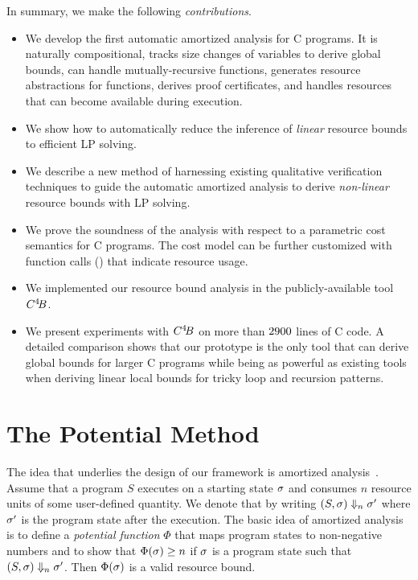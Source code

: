 \documentclass{sigplanconf}
\newcommand{\ifshort}[2]{\ifx\fullversion\undefined{#1}\else{#2}\fi}
\newcommand{\itemskip}[0]{\ifshort{\vspace{-3pt}}{}}
\newcommand{\itemskipIn}[0]{\ifshort{\vspace{-1pt}}{}}
\newcommand{\sectskip}[0]{\ifshort{\vspace{-3pt}}{}}
\newcommand{\aftersectskip}[0]{\ifshort{\vspace{-1pt}}{}}
\begin{document}
In summary, we make the following \emph{contributions}.
\itemskip
\begin{itemize}
\item We develop the first automatic amortized analysis for C
  programs. It is naturally compositional, tracks size changes of
  variables to derive global bounds, can handle mutually-recursive
  functions, generates resource abstractions for functions, derives
  proof certificates, and handles resources that can
  become available during execution.
\itemskipIn
\item We show how to automatically reduce the inference of \emph{linear} resource
    bounds to efficient LP solving.
\itemskipIn
\item We describe a new method of harnessing existing qualitative
  verification techniques to guide the automatic amortized analysis
  to derive \emph{non-linear} resource bounds with LP solving.
\itemskipIn
\item We prove the soundness of the analysis with respect to a
  parametric cost semantics for C programs. The cost model can be
  further customized with function calls () that
  indicate resource usage. %
\itemskipIn
\item We implemented our resource bound analysis in the publicly-available tool $C^4\!B$.
\itemskipIn
\item We present experiments with $C^4\!B$ on more
  than $2900$ lines of C code. A detailed comparison shows that our
  prototype is the only tool that can derive global bounds for larger
  C programs while being as powerful as existing tools when deriving
  linear local bounds for tricky loop and recursion patterns.
\end{itemize}
\itemskip


\sectskip
\section{The Potential Method}
\aftersectskip

The idea that underlies the design of our framework is amortized
analysis~\cite{Tarjan-amort}.  Assume that a program $S$ executes
on a starting state $\sigma$ and consumes $n$ resource units of
some user-defined quantity.  We denote that by writing $(S, \sigma)
\Downarrow_n \sigma'$ where $\sigma'$ is the program state after
the execution.  The basic idea of amortized analysis is to define a
\emph{potential function} $\Phi$ that maps program states to non-negative
numbers and to show that $\Phi(\sigma) \geq n$ if $\sigma$ is a program
state such that $(S, \sigma) \Downarrow_n \sigma'$.  Then
$\Phi(\sigma)$ is a valid resource bound.
\end{document}
